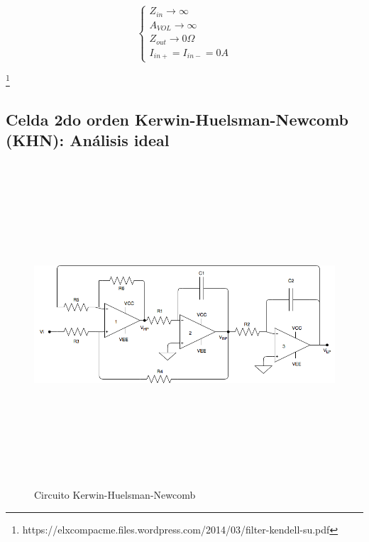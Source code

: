 \begin{equation}
	\begin{cases}
		Z_{in} \to \infty\\
		A_{VOL} \to \infty\\
		Z_{out} \to 0\Omega\\
		I_{in+} = I_{in-} = 0A
		
	\end{cases}
\end{equation}


\footnote{https://elxcompacme.files.wordpress.com/2014/03/filter-kendell-su.pdf}
\subsection{Celda 2do orden Kerwin-Huelsman-Newcomb (KHN): An\'alisis ideal}


\begin{figure}[H] %
	\centering
	\includegraphics[width=12cm,height=12cm,keepaspectratio]{../EJ4/imagenes/KERWIN.png}
	\caption{Circuito Kerwin-Huelsman-Newcomb}
	\label{kerwin}
\end{figure}

